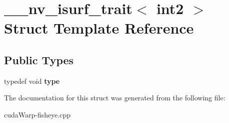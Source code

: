 \hypertarget{struct____nv__isurf__trait_3_01int2_01_4}{}\section{\+\_\+\+\_\+nv\+\_\+isurf\+\_\+trait$<$ int2 $>$ Struct Template Reference}
\label{struct____nv__isurf__trait_3_01int2_01_4}
\subsection*{Public Types}
\begin{DoxyCompactItemize}
\item 
typedef void {\bfseries type}\hypertarget{struct____nv__isurf__trait_3_01int2_01_4_a5b2347881191fc64f86cf47a5824df34}{}\label{struct____nv__isurf__trait_3_01int2_01_4_a5b2347881191fc64f86cf47a5824df34}

\end{DoxyCompactItemize}


The documentation for this struct was generated from the following file\+:\begin{DoxyCompactItemize}
\item 
cuda\+Warp-\/fisheye.\+cpp\end{DoxyCompactItemize}

